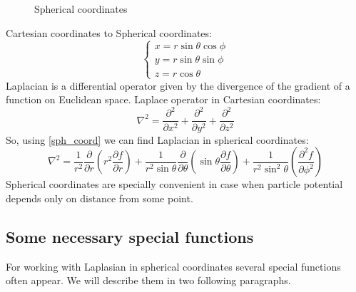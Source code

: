 \documentclass[a4paper, 12pt]{article}
\begin{document}
%
%
\begin{figure}[h!]
\begin{center}
\end{center}
\caption{Spherical coordinates}
\end{figure}
Cartesian coordinates to Spherical coordinates:
\begin{equation} \label{sph_coord}
\begin{cases}
	{x}= {r} \sin{\theta}\cos{\phi} \\
	{y} = {r} \sin{\theta}\sin{\phi} \\
	{z} = {r}\cos{\theta}
\end{cases}
\end{equation}
Laplacian is a differential operator given by the divergence of the gradient of a function on Euclidean space. Laplace operator in Cartesian coordinates:
 	$$\nabla^2= \frac{\partial^2}{\partial x^2}  + \frac{\partial^2}{\partial y^2} + \frac{\partial^2}{\partial z^2}$$
So, using \eqref{sph_coord} we can find Laplacian in spherical coordinates:
\begin{equation}\label{sph_lap}
	\nabla^2 = \frac{1}{r^2} \frac{\partial}{\partial r}({r^2}\frac{\partial f}{\partial r})+\frac{1}{r^2\sin{\theta}}\frac{\partial}{\partial \theta}(\sin{\theta}\frac{\partial f}{\partial \theta})+\frac{1}{r^2\sin^2{\theta}}(\frac{\partial^2 f}{\partial \phi^2})
\end{equation}
Spherical coordinates are specially convenient in case when particle potential depends only on distance from some point.


\subsection{Some  necessary special functions}
For working with Laplasian in spherical coordinates several special functions often appear. We will describe them in two following paragraphs.
\end{document}
